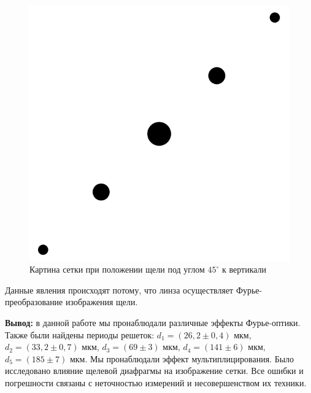 \documentclass[a4paper,12pt]{article} %
\begin{document}
 	\begin{figure}[h!]
 		\centering
 		\includegraphics[scale=0.65]{Pictures/45град}
 		\caption{Картина сетки при положении щели под углом $45^\circ$ к вертикали}
 	\end{figure}
 
 	Данные явления происходят потому, что линза осуществляет Фурье-преобразование изображения щели. 
  
  	\newpage
  	
 	\textbf{{\large Вывод:}} в данной работе мы пронаблюдали различные эффекты Фурье-оптики. Также были найдены периоды решеток: $d_1 = (26,2 \pm 0,4)$ мкм, $d_2 = (33,2 \pm 0,7)$ мкм, $d_3 = (69 \pm 3)$ мкм, $d_4 = (141 \pm 6)$ мкм, $d_5 = (185 \pm 7)$ мкм. Мы пронаблюдали эффект мультиплицирования. Было исследовано влияние щелевой диафрагмы на изображение сетки. Все ошибки и погрешности связаны с неточностью измерений и несовершенством их техники.  
  
\end{document}
